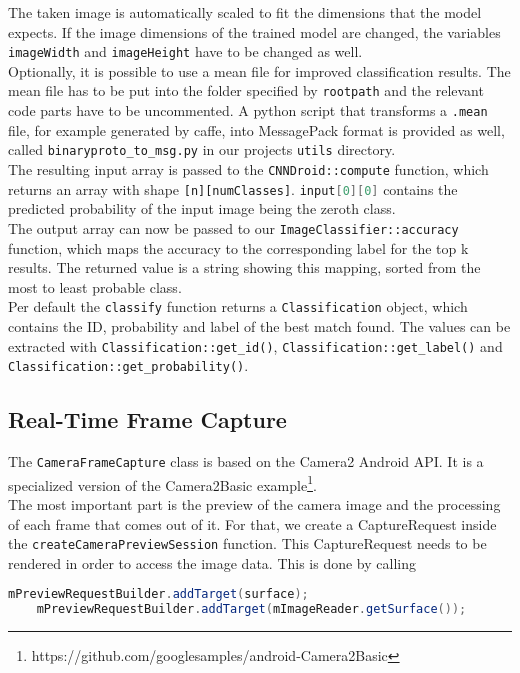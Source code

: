 The taken image is automatically scaled to fit the dimensions that the model expects. If the image dimensions of the trained model are changed, the variables \texttt{imageWidth} and \texttt{imageHeight} have to be changed as well.\\
Optionally, it is possible to use a mean file for improved classification results. The mean file has to be put into the folder specified by \texttt{rootpath} and the relevant code parts have to be uncommented. A python script that transforms a \texttt{.mean} file, for example generated by caffe, into MessagePack format is provided as well, called \texttt{binaryproto\_to\_msg.py} in our projects \texttt{utils} directory.\\
The resulting input array is passed to the \texttt{CNNDroid::compute} function, which returns an array with shape \texttt{[n][numClasses]}. \lstinline[language=Java]{input[0][0]} contains the predicted probability of the input image being the zeroth class.\\
The output array can now be passed to our \texttt{ImageClassifier::accuracy} function, which maps the accuracy to the corresponding label for the top k results. The returned value is a string showing this mapping, sorted from the most to least probable class.\\
Per default the \texttt{classify} function returns a \texttt{Classification} object, which contains the ID, probability and label of the best match found. The values can be extracted with \texttt{Classification::get\_id()}, \texttt{Classification::get\_label()} and \texttt{Classification::get\_probability()}.

\subsection {Real-Time Frame Capture}
The \texttt{CameraFrameCapture} class is based on the Camera2 Android API. It is a specialized version of the Camera2Basic example\footnote{https://github.com/googlesamples/android-Camera2Basic}.\\
The most important part is the preview of the camera image and the processing of each frame that comes out of it. For that, we create a CaptureRequest inside the \texttt{createCameraPreviewSession} function. This CaptureRequest needs to be rendered in order to access the image data. This is done by calling
\begin{lstlisting}[language=Java, basicstyle=\scriptsize]
    mPreviewRequestBuilder.addTarget(surface);
    mPreviewRequestBuilder.addTarget(mImageReader.getSurface());
\end{lstlisting}


